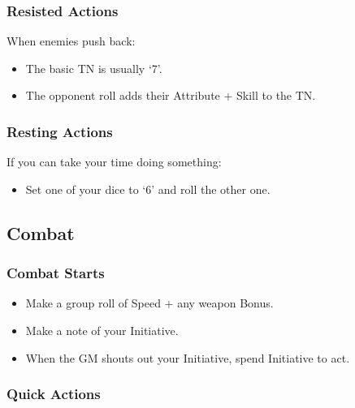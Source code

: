 \begin{multicols}{2}
\begin{itemize}
\end{itemize}

\subsubsection{Resisted Actions}

When enemies push back:

\begin{itemize}

\item{The basic TN is usually `7'.}
\item{The opponent roll adds their Attribute + Skill to the TN.}

\end{itemize}

\subsubsection{Resting Actions}

If you can take your time doing something:

\begin{itemize}

\item{Set one of your dice to `6' and roll the other one.}

\end{itemize}

\subsection{Combat}

\subsubsection{Combat Starts}

\begin{itemize}

	\item{Make a group roll of Speed + any weapon Bonus.}
	\item{Make a note of your Initiative.}
	\item{When the GM shouts out your Initiative, spend Initiative to act.}
\end{itemize}

\subsubsection{Quick Actions}


\end{multicols}
